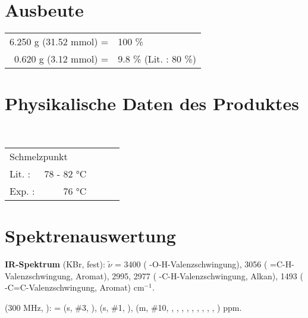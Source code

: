 \documentclass[12pt]{article}
\begin{document}
\begin{onehalfspace}
\section{Ausbeute} 
\begin{tabular}{ rl}
  6.250 g (31.52 mmol) =  & 100 \%\\
  0.620 g (3.12 mmol) =  &  9.8 \% (Lit.\cite{organikum} : 80 \%) \\
 \end{tabular}
\newpage
\section{Physikalische Daten des Produktes} 
\textit{} \\[0.2cm]
\begin{tabular}{ lrclc }
 \multicolumn{2}{l}{Schmelzpunkt} & &   \\
   Lit. \cite{alpha} : &  78 - 82 \si{\celsius}  & &  \\
   Exp. :&  76 \si{\celsius} & &  \\
 \end{tabular}

\section{Spektrenauswertung} 
\textbf{IR-Spektrum} (KBr, fest): $\tilde{\nu}$ = 3400 ( -O-H-Valenzschwingung), 3056 ( =C-H-Valenzschwingung, Aromat), 2995, 2977 ( -C-H-Valenzschwingung, Alkan), 1493 ( -C=C-Valenzschwingung, Aromat) cm$^{-1}$.\\

\begin{experimental}[format=\bfseries,delta=(ppm),list=true,use-equal,pos-number = side]
\begin{minipage}[b]{0.60\textwidth} 
\NMR* (300 \si{\MHz}, ): \chemdelta = 
 (s, \#{3}, ),
 (s, \#{1}, ),
 (m, \#{10}, , , , , , , , , , ) ppm.
\end{minipage}
 \hfill
\begin{minipage}[t][][b]{0.40\textwidth} 


\end{minipage}
\end{experimental}
\end{onehalfspace}
\end{document}
